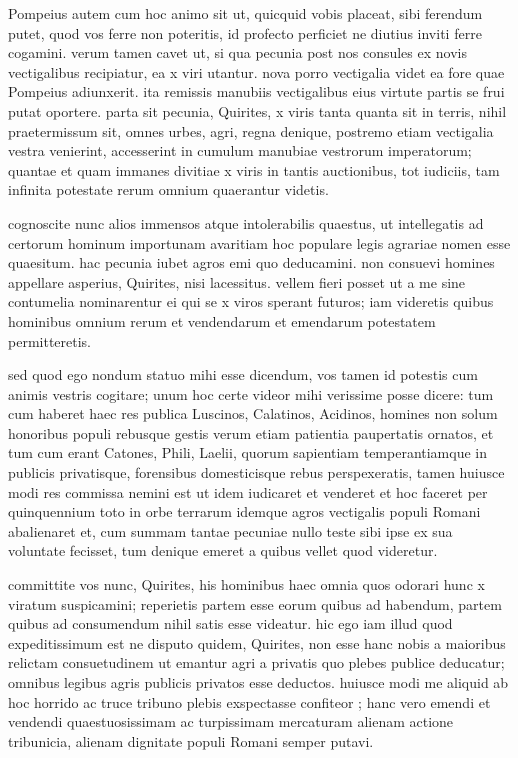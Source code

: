  Pompeius autem cum hoc animo sit ut, quicquid vobis placeat, sibi ferendum putet, quod vos ferre non poteritis, id profecto perficiet ne diutius inviti ferre cogamini. verum tamen cavet ut, si qua pecunia post nos consules ex novis vectigalibus recipiatur, ea x viri utantur. nova porro vectigalia videt ea fore quae Pompeius adiunxerit. ita remissis manubiis vectigalibus eius virtute partis se frui putat oportere. parta sit pecunia, Quirites, x viris tanta quanta sit in terris, nihil praetermissum sit, omnes urbes, agri, regna denique, postremo etiam vectigalia vestra venierint, accesserint in cumulum manubiae vestrorum imperatorum; quantae et quam immanes divitiae x viris in tantis auctionibus, tot iudiciis, tam infinita potestate rerum omnium quaerantur videtis.

 cognoscite nunc alios immensos atque intolerabilis quaestus, ut intellegatis ad certorum hominum importunam avaritiam hoc populare legis agrariae nomen esse quaesitum. hac pecunia iubet agros emi quo deducamini. non consuevi homines appellare asperius, Quirites, nisi lacessitus. vellem fieri posset ut a me sine contumelia nominarentur ei qui se x viros sperant futuros; iam videretis quibus hominibus omnium rerum et vendendarum et emendarum potestatem permitteretis.

 sed quod ego nondum statuo mihi esse dicendum, vos tamen id potestis cum animis vestris cogitare; unum hoc certe videor mihi verissime posse dicere: tum cum haberet haec res publica Luscinos, Calatinos, Acidinos, homines non solum honoribus populi rebusque gestis verum etiam patientia paupertatis ornatos, et tum cum erant Catones, Phili, Laelii, quorum sapientiam temperantiamque in publicis privatisque, forensibus domesticisque rebus perspexeratis, tamen huiusce modi res commissa nemini est ut idem iudicaret et venderet et hoc faceret per quinquennium toto in orbe terrarum idemque agros vectigalis populi Romani abalienaret et, cum summam tantae pecuniae nullo teste sibi ipse ex sua voluntate fecisset, tum denique emeret a quibus vellet quod videretur.

 committite vos nunc, Quirites, his hominibus haec omnia quos odorari hunc x viratum suspicamini; reperietis partem esse eorum quibus ad habendum, partem quibus ad consumendum nihil satis esse videatur. hic ego iam illud quod expeditissimum est ne disputo quidem, Quirites, non esse hanc nobis a maioribus relictam consuetudinem ut emantur agri a privatis quo plebes publice deducatur; omnibus legibus agris publicis privatos esse deductos. huiusce modi me aliquid ab hoc horrido ac truce tribuno plebis exspectasse confiteor ; hanc vero emendi et vendendi quaestuosissimam ac turpissimam mercaturam alienam actione tribunicia, alienam dignitate populi Romani semper putavi.

